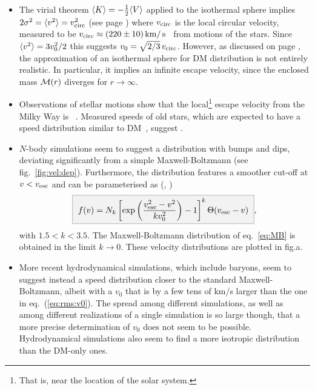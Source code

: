 \begin{itemize}

\item[$\circ$] The virial theorem $\langle K\rangle = -\frac12\langle V\rangle$ 
applied to the isothermal sphere implies
$2\sigma^2 = \langle v^2\rangle=v_{\rm circ}^2$ (see page \pageref{vcircisot})
where
$v_{\rm circ}$ is the local circular velocity, measured to be
$v_{\rm circ}\approx (220\pm 10)\,{\rm km}/\,{\rm s}$~\cite{astro-ph/9706293} from motions of the stars.
Since $\langle v^2\rangle=3v_0^2/2$ this suggests $v_0 =\sqrt{2/3} \, v_{\rm circ}$. 
However, as discussed on page \pageref{vcircisot}, the approximation of an isothermal sphere for DM distribution is not entirely realistic. In particular, it implies 
an infinite escape velocity, since the enclosed mass ${\mathcal{M}} (r)$ diverges for $r\to \infty$.


\item[$\circ$] Observations of stellar motions show that the local\footnote{That is, near the location of the solar system.} escape velocity from the Milky Way is~\cite{Smith:2006ym} 
\beq 
\label{eq:vesc:range}
.
\eeq
Measured speeds of old stars, which are 
expected to have a speed distribution similar to DM~\cite{1704.04499}, 
suggest 
\beq \label{eq:rms:v0}
.
\eeq





\item[$\circ$] 
$N$-body simulations seem to suggest a distribution with bumps and dips, deviating significantly from a simple Maxwell-Boltzmann (see fig.~\ref{fig:vel:dep}). Furthermore, the distribution features a smoother cut-off at $v<v_{\rm esc}$ and can be parameterised as (,  \cite{fvNbody})
\begin{equation}
\label{eq:fk}
\bbox{ f(v)= N_k \left[\exp\left(\frac{v_{\rm esc}^2-v^2}{kv_0^2}\right)-1\right]^k  \Theta(v_{\rm esc}-v)},
\end{equation}
with $1.5<k<3.5$. The Maxwell-Boltzmann 
distribution of eq.~\eqref{eq:MB} is obtained in the limit $k\rightarrow 0$.
These velocity distributions are plotted in fig.a.

\item[$\circ$] 
More recent hydrodynamical simulations, which include baryons, seem 
to suggest instead a speed distribution closer to the standard Maxwell-Boltzmann, albeit with a $v_0$ that is  by a few tens of km/s larger than the one in eq.~(\ref{eq:rms:v0}). 
The spread among different simulations, as well as among different realizations of a single simulation is so large though, that a more precise determination of $v_0$ does not seem to be possible. Hydrodynamical simulations also seem to find a more isotropic distribution than the DM-only ones.
\end{itemize}

